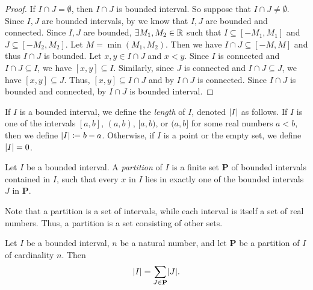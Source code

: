 \begin{proof}
  If \(I \cap J = \emptyset\), then \(I \cap J\) is bounded interval.
  So suppose that \(I \cap J \neq \emptyset\).
  Since \(I, J\) are bounded intervals, by  we know that \(I, J\) are bounded and connected.
  Since \(I, J\) are bounded, \(\exists M_1, M_2 \in \mathbb{R}\) such that \(I \subseteq [-M_1, M_1]\) and \(J \subseteq [-M_2, M_2]\).
  Let \(M = \min(M_1, M_2)\).
  Then we have \(I \cap J \subseteq [-M, M]\) and thus \(I \cap J\) is bounded.
  Let \(x, y \in I \cap J\) and \(x < y\).
  Since \(I\) is connected and \(I \cap J \subseteq I\), we have \([x, y] \subseteq I\).
  Similarly, since \(J\) is connected and \(I \cap J \subseteq J\), we have \([x, y] \subseteq J\).
  Thus, \([x, y] \subseteq I \cap J\) and by  \(I \cap J\) is connected.
  Since \(I \cap J\) is bounded and connected, by  \(I \cap J\) is bounded interval.
\end{proof}

\setcounter{thm}{7}
\begin{defn}\label{i:11.1.8}
  If \(I\) is a bounded interval, we define the \emph{length} of \(I\), denoted \(\left\lvert I\right\rvert\) as follows.
  If \(I\) is one of the intervals \([a, b]\), \((a, b)\), \([a, b)\), or \((a, b]\) for some real numbers \(a < b\), then we define \(\left\lvert I\right\rvert \coloneqq b - a\).
  Otherwise, if \(I\) is a point or the empty set, we define \(\left\lvert I\right\rvert = 0\).
\end{defn}

\setcounter{thm}{9}
\begin{defn}[Partitions]\label{i:11.1.10}
  Let \(I\) be a bounded interval.
  A \emph{partition} of \(I\) is a finite set \(\mathbf{P}\) of bounded intervals contained in \(I\), such that every \(x\) in \(I\) lies in exactly one of the bounded intervals \(J\) in \(\mathbf{P}\).
\end{defn}

\begin{rmk}\label{i:11.1.11}
  Note that a partition is a set of intervals, while each interval is itself a set of real numbers.
  Thus, a partition is a set consisting of other sets.
\end{rmk}

\setcounter{thm}{12}
\begin{thm}\label{i:11.1.13}
  Let \(I\) be a bounded interval, \(n\) be a natural number, and let \(\mathbf{P}\) be a partition of \(I\) of cardinality \(n\).
  Then
  \[
    \abs{I} = \sum_{J \in \mathbf{P}} \abs{J}.
  \]
\end{thm}

